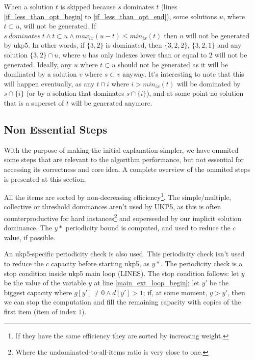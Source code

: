 \documentclass[runningheads,a4paper]{llncs}
\begin{document}
When a solution \(t\) is skipped because \(s\) dominates \(t\) (lines \ref{if_less_than_opt_begin} to \ref{if_less_than_opt_end}), some solutions \(u\), where \(t \subset u\), will not be generated. If \(s~dominates~t \land t \subset u \land max_{ix}(u - t) \leq min_{ix}(t)\) then \(u\) will not be generated by ukp5. In other words, if \(\{3, 2\}\) is dominated, then \(\{3, 2, 2\}\), \(\{3, 2, 1\}\) and any solution \(\{3, 2\} \cap u\), where \(u\) has only indexes lower than or equal to \(2\) will not be generated. Ideally, any \(u\) where \(t \subset u\) should not be generated as it will be dominated by a solution \(v\) where \(s \subset v\) anyway. It's interesting to note that this will happen eventually, as any \(t \cap {i}\) where \(i > min_{ix}(t)\) will be dominated by \(s \cap \{i\}\) (or by a solution that dominates \(s \cap \{i\}\)), and at some point no solution that is a superset of \(t\) will be generated anymore.

\subsection{Non Essential Steps}

With the purpose of making the initial explanation simpler, we have ommited some steps that are relevant to the algorithm performance, but not essential for accessing its correctness and core idea. A complete overview of the ommited steps is presented at this section.

All the items are sorted by non-decreasing efficiency\footnote{If they have the same efficiency they are sorted by increasing weight.}. The simple/multiple, collective or threshold dominances aren't used by UKP5, as this is often counterproductive for hard instances\footnote{Where the undominated-to-all-items ratio is very close to one.} and superseeded by our implicit solution dominance. The \(y*\) periodicity bound is computed\cite[p. 223]{CGAR}, and used to reduce the \(c\) value, if possible.

An ukp5-specific periodicity check is also used. This periodicity check isn't used to reduce the \(c\) capacity before starting ukp5, as \(y*\). The periodicity check is a stop condition inside ukp5 main loop (LINES). The stop condition follows: let \(y\) be the value of the variable \(y\) at line \ref{main_ext_loop_begin}; let \(y'\) be the biggest capacity where \(g[y'] \neq 0 \land d[y'] > 1\); if, at some moment, \(y > y'\), then we can stop the computation and fill the remaining capacity with copies of the first item (item of index \(1\)).%
\end{document}
